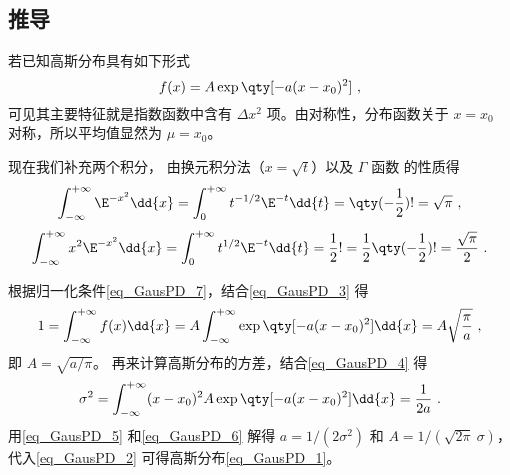 \subsection{推导}
若已知高斯分布具有如下形式
\begin{equation}\label{eq_GausPD_2}
f(x) = A\exp\qty[-a (x - x_0)^2]~,
\end{equation}
可见其主要特征就是指数函数中含有 $\Delta x^2$ 项。由对称性，分布函数关于 $x =x_0$ 对称，所以平均值显然为 $\mu = x_0$。

现在我们补充两个积分， 由换元积分法（$x=\sqrt{t}$）以及 $\Gamma$ 函数 的性质得
\begin{equation}\label{eq_GausPD_3}
\int_{-\infty }^{+\infty } \E^{-x^2}\dd{x}  = \int_0^{+\infty} t^{-1/2}\E^{ - t} \dd{t}  = \qty(-\frac12)! = \sqrt \pi ~,
\end{equation}
\begin{equation}\label{eq_GausPD_4}
\int_{-\infty}^{+\infty} x^2 \E^{-x^2}\dd{x}  = \int_0^{+\infty} t^{1/2}\E^{-t} \dd{t}  = \frac12 ! = \frac12 \qty(-\frac12)! = \frac{\sqrt\pi}{2}~.
\end{equation}

根据归一化条件\autoref{eq_GausPD_7}，结合\autoref{eq_GausPD_3} 得
\begin{equation}\label{eq_GausPD_5}
1 = \int_{-\infty}^{+\infty} f(x) \dd{x}  = A\int_{-\infty}^{+\infty} \exp\qty[-a (x - x_0)^2] \dd{x}  = A\sqrt{\frac{\pi}{a}}~,
\end{equation}
即 $A = \sqrt{a/\pi}$。 再来计算高斯分布的方差，结合\autoref{eq_GausPD_4} 得
\begin{equation}\label{eq_GausPD_6}
\sigma ^2 = \int_{-\infty}^{+\infty} (x - x_0)^2 A\exp\qty[-a (x - x_0)^2] \dd{x}  = \frac{1}{2a}~.
\end{equation}
用\autoref{eq_GausPD_5} 和\autoref{eq_GausPD_6} 解得 $a = 1/(2\sigma^2)$ 和 $A = 1/(\sqrt{2\pi}\ \sigma)$，代入\autoref{eq_GausPD_2} 可得高斯分布\autoref{eq_GausPD_1}。
